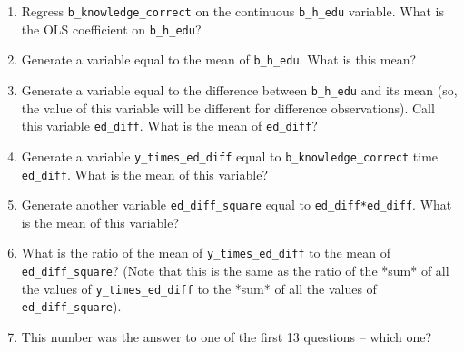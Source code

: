\documentclass[11pt]{article}
\begin{document}
\begin{enumerate}
\item Regress \texttt{b\_knowledge\_correct} on the continuous \texttt{b\_h\_edu} variable.  What is 
	the OLS coefficient on \texttt{b\_h\_edu}?


\item Generate a variable equal to the mean of \texttt{b\_h\_edu}.  What is this mean?


\item Generate a variable equal to the difference between \texttt{b\_h\_edu} and its mean 
	(so, the value of this variable will be different for difference 
	observations). Call this variable \texttt{ed\_diff}. What is the mean of \texttt{ed\_diff}?


\item Generate a variable \texttt{y\_times\_ed\_diff} equal to \texttt{b\_knowledge\_correct} time 
	\texttt{ed\_diff}.  What is the mean of this variable?


\item Generate another variable \texttt{ed\_diff\_square} equal to \texttt{ed\_diff*ed\_diff}.  What 
	is the mean of this variable?


\item What is the ratio of the mean of \texttt{y\_times\_ed\_diff} to the mean of 
	\texttt{ed\_diff\_square}?  (Note that this is the same as the ratio of the *sum* 
	of all the values of \texttt{y\_times\_ed\_diff} to the *sum* of all the values of 
	\texttt{ed\_diff\_square}).


\item This number was the answer to one of the first 13 questions -- which one?

\end{enumerate}
\end{document}
